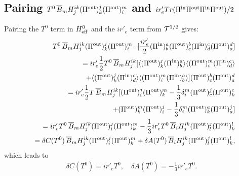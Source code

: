 \documentclass[aps,preprint,floats,epsf,epsfig,nofootinbib,letter]{revtex4}
\newcommand{\be}{\begin{eqnarray}}
\newcommand{\en}{\end{eqnarray}}
\newcommand{\T}{{\cal T}}
\newcommand{\la}{{\langle}}
\newcommand{\ra}{{\rangle}}
\newcommand{\non}{{\nonumber}}
\begin{document}
\subsection{Pairing $T^0\, \overline B_m H^{ik}_j (\Pi^{\rm out})^j_k (\Pi^{\rm out})^m_i$ and $i r'_eTr(\Pi^{\rm in}\Pi^{\rm out}\Pi^{\rm in}\Pi^{\rm out})/2$}
Pairing the $T^0$ term in $H^0_{\rm eff}$ and the $ir'_e$ term from $\T^{1/2}$ gives:
\be
&&
\hspace{-1cm}
  T^0\, \overline B_m H^{ik}_j (\Pi^{\rm out})^j_k (\Pi^{\rm out})^m_i 
 \cdot
[\frac{ir'_e}{2} (\Pi^{\rm in})^a_b(\Pi^{\rm out})^b_c(\Pi^{\rm in})^c_d(\Pi^{\rm out})^d_a]
\non\\
&&=ir'_e \frac{1}{2} T^0\, \overline B_m H^{ik}_j 
[\la (\Pi^{\rm out})^j_k (\Pi^{\rm in})^a_b\ra
\la (\Pi^{\rm out})^m_i  (\Pi^{\rm in})^c_d\ra
\non\\
&&\quad
+
\la (\Pi^{\rm out})^j_k  (\Pi^{\rm in})^c_d\ra
\la (\Pi^{\rm out})^m_i (\Pi^{\rm in})^a_b\ra]
(\Pi^{\rm out})^b_c (\Pi^{\rm out})^d_a
\non\\
&&=ir'_e \frac{1}{2} T\, \overline B_m H^{ik}_j 
[(\Pi^{\rm out})^j_i (\Pi^{\rm out})^m_k-\frac{1}{3}\delta^m_i   (\Pi^{\rm out})^j_c (\Pi^{\rm out})^c_k
\non\\
&&\quad+(\Pi^{\rm out})^m_k (\Pi^{\rm out})^j_i-\frac{1}{3} \delta^m_i (\Pi^{\rm out})^a_k (\Pi^{\rm out})^j_a]
\non\\
&&=ir'_e T^0\,\overline B_m H^{ik}_j (\Pi^{\rm out})^j_i (\Pi^{\rm out})^m_k
-\frac{1}{3}ir'_e T^0\,\overline B_i H^{ik}_j (\Pi^{\rm out})^j_l (\Pi^{\rm out})^l_k
\non\\
&&=\delta C(T^0)\,\overline B_m H^{ik}_j (\Pi^{\rm out})^j_i (\Pi^{\rm out})^m_k
+\delta A(T^0)\,\overline B_i H^{ik}_j (\Pi^{\rm out})^j_l (\Pi^{\rm out})^l_k,
\en
which leads to
\be
\delta C(T^0)=ir'_e T^0,
\quad
\delta A(T^0)=-\frac{1}{3}ir'_e T^0.
\en

\end{document}
